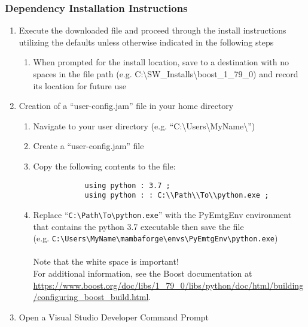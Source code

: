 \subsubsection{Dependency Installation Instructions}
\begin{enumerate}
	\item Execute the downloaded file and proceed through the install instructions utilizing the defaults unless otherwise indicated in the following steps 
	\begin{enumerate}
		\item When prompted for the install location, save to a destination with no spaces in the file path (e.g. C:\textbackslash SW\_Installs\textbackslash boost\_1\_79\_0) and record its location for future use
	\end{enumerate}
	\item Creation of a “user-config.jam” file in your home directory
	\begin{enumerate}
		\item Navigate to your user directory (e.g. “C:\textbackslash Users\textbackslash MyName\textbackslash”)
		\item Create a “user-config.jam” file
		\item Copy the following contents to the file: \\
		\begin{verbatim}
			using python : 3.7 ; 
			using python : : C:\\Path\\To\\python.exe ;
		\end{verbatim}	
		\item 
			Replace ``\texttt{C:\textbackslash Path\textbackslash To\textbackslash python.exe}'' with the PyEmtgEnv environment that 
			contains the python 3.7 executable then save the file \\
			(e.g. \texttt{C:\textbackslash Users\textbackslash MyName\textbackslash mambaforge\textbackslash envs\textbackslash PyEmtgEnv\textbackslash python.exe})
		\\ \\
		Note that the white space is important! \\ For additional information, see the Boost documentation at \url{https://www.boost.org/doc/libs/1_79_0/libs/python/doc/html/building/configuring_boost_build.html}.
	\end{enumerate}	
	\item Open a Visual Studio Developer Command Prompt 
		\begin{figure}[H]

\end{figure}
\end{enumerate}
